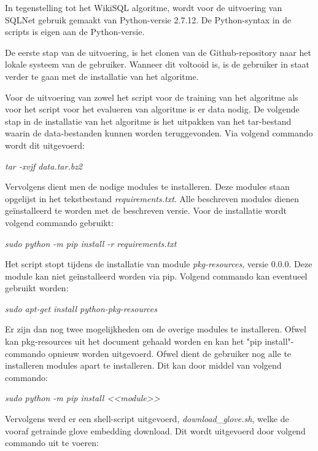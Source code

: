 In tegenstelling tot het WikiSQL algoritme, wordt voor de uitvoering van SQLNet gebruik gemaakt van Python-versie 2.7.12. De Python-syntax in de scripts is eigen aan de Python-versie. 

De eerste stap van de uitvoering, is het clonen van de Github-repository naar het lokale systeem van de gebruiker. Wanneer dit voltooid is, is de gebruiker in staat verder te gaan met de installatie van het algoritme. 

Voor de uitvoering van zowel het script voor de training van het algoritme als voor het script voor het evalueren van algoritme is er data nodig. De volgende stap in de installatie van het algoritme is het uitpakken van het tar-bestand waarin de data-bestanden kunnen worden teruggevonden. Via volgend commando wordt dit uitgevoerd:

\begin{center}
	\textit{tar -xvjf data.tar.bz2}
\end{center}

Vervolgens dient men de nodige modules te installeren. Deze modules staan opgelijst in het tekstbestand \textit{requirements.txt}. Alle beschreven modules dienen geïnstalleerd te worden met de beschreven versie. Voor de installatie wordt volgend commando gebruikt:

\begin{center}
	\textit{sudo python -m pip install -r requirements.txt}
\end{center}

Het script stopt tijdens de installatie van module \textit{pkg-resources}, versie 0.0.0. Deze module kan niet geïnstalleerd worden via pip. Volgend commando kan eventueel gebruikt worden:

\begin{center}
	\textit{sudo apt-get install python-pkg-resources}
\end{center}

Er zijn dan nog twee mogelijkheden om de overige modules te installeren. Ofwel kan pkg-resources uit het document gehaald worden en kan het "pip install"-commando opnieuw worden uitgevoerd. Ofwel dient de gebruiker nog alle te installeren modules apart te installeren. Dit kan door middel van volgend commando:

\begin{center}
	\textit{sudo python -m pip install <<module>>}
\end{center}

Vervolgens werd er een shell-script uitgevoerd, \textit{download\_glove.sh}, welke de vooraf getrainde glove embedding download. Dit wordt uitgevoerd door volgend commando uit te voeren:

